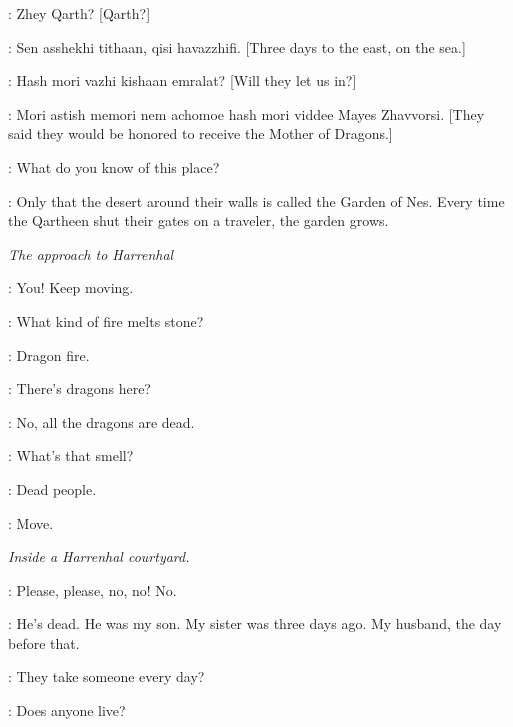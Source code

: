 \DAENERYS: Zhey Qarth? [Qarth?] 

\KOVARRO: Sen asshekhi tithaan, qisi havazzhifi. [Three days to the east, on the sea.] 

\DAENERYS: Hash mori vazhi kishaan emralat? [Will they let us in?] 

\KOVARRO: Mori astish memori nem achomoe hash mori viddee Mayes Zhavvorsi. [They said they would be honored to receive the Mother of Dragons.] 


\DAENERYS: What do you know of this place? 

\JORAH: Only that the desert around their walls is called the Garden of Nes. Every time the Qartheen shut their gates on a traveler, the garden grows. 


\scene

\textit{The approach to Harrenhal} 


\GUARD: You! Keep moving. 

\GENDRY: What kind of fire melts stone? 

\ARYA: Dragon fire. 

\HOTPIE: There's dragons here? 

\GENDRY: No, all the dragons are dead. 

\HOTPIE: What's that smell? 

\ARYA: Dead people. 

\GUARD: Move. 




\scene

\textit{Inside a Harrenhal courtyard.} 



\VICTIM: Please, please, no, no! No. 


\PEASANTWOMAN: He's dead. He was my son. My sister was three days ago. My husband, the day before that. 

\GENDRY: They take someone every day? 

\ARYA: Does anyone live? 


